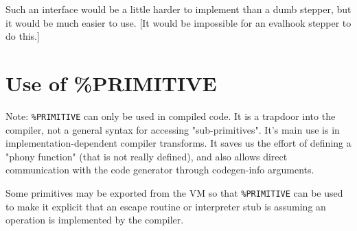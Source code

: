 Such an interface would be a little harder to implement than a dumb stepper,
but it would be much easier to use.  [It would be impossible for an evalhook
stepper to do this.]


\section{Use of \%PRIMITIVE}

Note: \verb|%PRIMITIVE| can only be used in compiled code. It is a
trapdoor into the compiler, not a general syntax for accessing
"sub-primitives". It's main use is in implementation-dependent
compiler transforms. It saves us the effort of defining a "phony
function" (that is not really defined), and also allows direct
communication with the code generator through codegen-info arguments.

Some primitives may be exported from the VM so that \verb|%PRIMITIVE|
can be used to make it explicit that an escape routine or interpreter
stub is assuming an operation is implemented by the compiler.
